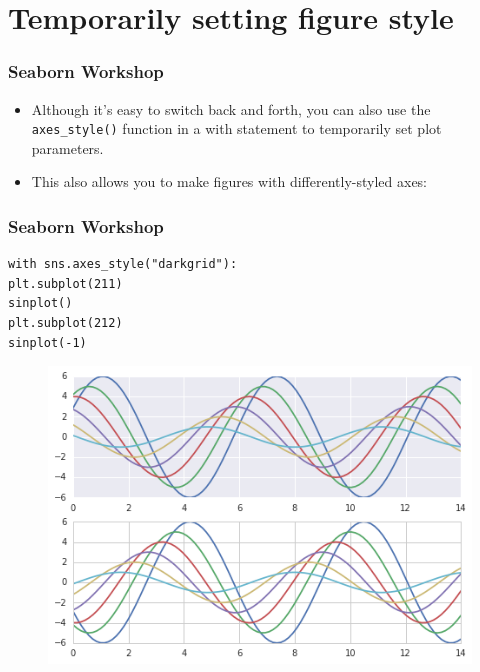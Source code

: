 \documentclass{beamer}
\begin{document}
\section{Temporarily setting figure style}
\begin{frame}[fragile]
	\frametitle{Seaborn Workshop}
	\large
	\begin{itemize}
\item Although it’s easy to switch back and forth, you can also use the \texttt{axes\_style()} function in a with statement to temporarily set plot parameters. 
\item This also allows you to make figures with differently-styled axes:
	\end{itemize}

\end{frame}
\begin{frame}[fragile]
	\frametitle{Seaborn Workshop}
	\large
\begin{verbatim}
with sns.axes_style("darkgrid"):
plt.subplot(211)
sinplot()
plt.subplot(212)
sinplot(-1)
\end{verbatim}
\begin{figure}
\centering
\includegraphics[width=0.7\linewidth]{images/aesthetics_27_0}
\end{figure}

\end{frame}
\end{document}
